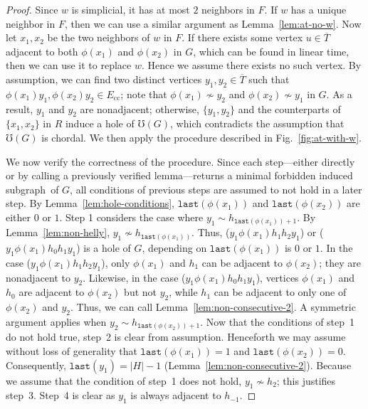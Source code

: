 \documentclass[10pt]{article}
\newcommand{\badgraph}{minimal forbidden induced subgraph}
\newcommand{\head}[1]{\ensuremath{{\mathtt{last}(#1)}}}
\newcommand{\ecc}{\ensuremath{E_{\text{cc}}}}
\newcommand{\oo}{\ensuremath{T}}
\newcommand{\og}[1]{\ensuremath{\phi(#1)}}
\begin{document}
\begin{proof}
  Since $w$ is simplicial, it has at most $2$ neighbors in $F$.  If
  $w$ has a unique neighbor in $F$, then we can use a similar argument
  as Lemma~\ref{lem:at-no-w}.  Now let ${x_1}, x_2$ be the two
  neighbors of $w$ in $F$.  If there exists some vertex $u\in
  \overline{\oo}$ adjacent to both {\og{x_1}} and \og{x_2} in $G$,
  which can be found in linear time, then we can use it to replace $w$.
  Hence we assume there exists no such vertex.  By assumption, we can
  find two distinct vertices $y_1, y_2\in \overline{\oo}$ such that
  $\og{x_1} y_1, \og{x_2} y_2\in \ecc$; note that $\og{x_1}\not\sim
  y_2$ and $\og{x_2}\not\sim y_1$ in $G$.  As a result, $y_1$ and
  $y_2$ are nonadjacent; otherwise, $\{y_1, y_2\}$ and the
  counterparts of $\{{x_1}, x_2\}$ in $R$ induce a hole of $\mho(G)$,
  which contradicts the assumption that $\mho(G)$ is chordal.  We then
  apply the procedure described in Fig.~\ref{fig:at-with-w}.

  We now verify the correctness of the procedure.  Since each
  step---either directly or by calling a previously verified
  lemma---returns a \badgraph\ of $G$, all conditions of previous
  steps are assumed to not hold in a later step.  By
  Lemma~\ref{lem:hole-conditions}, $\head{\og{x_1}}$ and
  $\head{\og{x_2}}$ are either $0$ or $1$.  Step 1 considers the case
  where $y_1\sim h_{\head{\og{x_1}} + 1}$.  By
  Lemma~\ref{lem:non-helly}, $y_1\not\sim h_{\head{\og{x_1}}}$.  Thus,
  ($y_1 \og{x_1} h_{1} h_2 y_1$) or ($y_1 \og{x_1} h_{0} h_1 y_1$) is
  a hole of $G$, depending on ${\head{\og{x_1}}}$ is $0$ or $1$.  In
  the case ($y_1 \og{x_1} h_{1} h_2 y_1$), only $\og{x_1}$ and $h_1$
  can be adjacent to $\og{x_2}$; they are nonadjacent to $y_2$.
  Likewise, in the case ($y_1 \og{x_1} h_{0} h_1 y_1$), vertices
  $\og{x_1}$ and $h_0$ are adjacent to $\og{x_2}$ but not $y_2$, while
  $h_1$ can be adjacent to only one of $\og{x_2}$ and $y_2$.  Thus, we
  can call Lemma~\ref{lem:non-consecutive-2}.  A symmetric argument
  applies when $y_2\sim h_{\head{\og{x_2}} + 1}$.  Now that the
  conditions of step~1 do not hold true, step~2 is clear from
  assumption.  Henceforth we may assume without loss of generality
  that $\head{\og{x_1}} =1$ and $\head{\og{x_2}}= 0$.  Consequently,
  $\head{{y_1}} = |H| - 1$ (Lemma~\ref{lem:non-consecutive-2}).
  Because we assume that the condition of step~1 does not hold,
  $y_1\not\sim h_2$; this justifies step~3.  Step~4 is clear as $y_1$
  is always adjacent to $h_{-1}$.
  \end{proof}
\end{document}
